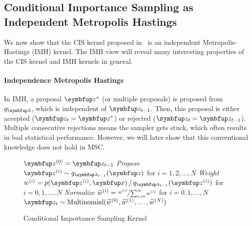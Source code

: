 %
\subsection{Conditional Importance Sampling as Independent Metropolis Hastings}\label{section:cis_imh}
We now show that the CIS kernel proposed in~\citep{NEURIPS2020_b2070693} is an independent Metropolis-Hastings (IMH) kernel.
The IMH view will reveal many interesting properties of the CIS kernel and IMH kernels in general.

\paragraph{Independence Metropolis Hastings}
In IMH, a proposal \(\vz^*\) (or multiple proposals) is proposed from \(q_{\vlambda}\), which is independent of \(\vz_{t-1}\).
Then, this proposal is either accepted (\(\vz_{t} = \vz^*\)) or rejected (\(\vz_{t} = \vz_{t-1}\)).
Multiple consecutive rejections means the sampler gets stuck, which often results in bad statistical performance.
However, we will later show that this conventional knowledge does not hold in MSC.

\begin{figure}
  \begin{algorithm2e}[H]
    \DontPrintSemicolon
    \SetAlgoLined
    \(\vz^{(0)} = \vz_{t-1}\) \;
    \textit{Propose} \(\vz^{(i)} \sim q_{\vlambda_{t-1}}(\vz)\) for \(i = 1, 2,\ldots, N\) \;
    \textit{Weight} \(w^{(i)} = p(\vz^{(i)},\vx) \,/\, q_{\vlambda_{t-1}}(\vz^{(i)}) \) for \(i = 0, 1,\ldots, N\)\;
    \textit{Normalize} \(\widetilde{w}^{(i)} = \nicefrac{w^{(i)}}{ \sum^{N}_{i=0} w^{(i)} }\) for \(i = 0, 1,\ldots, N\)\;
    \(\vz_{t} \sim \mathrm{Multinomial}(\widetilde{w}^{(0)}, \widetilde{w}^{(1)}, \ldots, \widetilde{w}^{(N)}) \)\;
    \caption{Conditional Importance Sampling Kernel}\label{alg:cis}
  \end{algorithm2e}
\end{figure}
%
